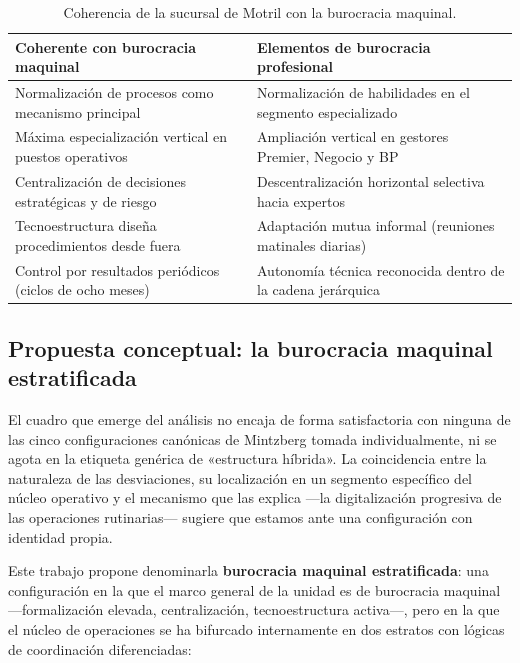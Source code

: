\begin{table}[htbp]
  \centering
  \caption{Coherencia de la sucursal de Motril con la burocracia maquinal.}
  \label{tab:coherencia}
  \small
  \begin{tabular}{p{6.2cm} p{6.2cm}}
    \toprule
    \textbf{Coherente con burocracia maquinal} & \textbf{Elementos de burocracia profesional} \\
    \midrule
    Normalización de procesos como mecanismo principal &
    Normalización de habilidades en el segmento especializado \\
    \addlinespace
    Máxima especialización vertical en puestos operativos &
    Ampliación vertical en gestores Premier, Negocio y BP \\
    \addlinespace
    Centralización de decisiones estratégicas y de riesgo &
    Descentralización horizontal selectiva hacia expertos \\
    \addlinespace
    Tecnoestructura diseña procedimientos desde fuera &
    Adaptación mutua informal (reuniones matinales diarias) \\
    \addlinespace
    Control por resultados periódicos (ciclos de ocho meses) &
    Autonomía técnica reconocida dentro de la cadena jerárquica \\
    \bottomrule
  \end{tabular}
\end{table}

\subsection{Propuesta conceptual: la burocracia maquinal estratificada}
\label{sec:bme}

El cuadro que emerge del análisis no encaja de forma satisfactoria con ninguna de
las cinco configuraciones canónicas de Mintzberg tomada individualmente, ni se
agota en la etiqueta genérica de «estructura híbrida». La coincidencia entre la
naturaleza de las desviaciones, su localización en un segmento específico del núcleo
operativo y el mecanismo que las explica ---la digitalización progresiva de las
operaciones rutinarias--- sugiere que estamos ante una configuración con identidad
propia.

Este trabajo propone denominarla \textbf{burocracia maquinal estratificada}: una
configuración en la que el marco general de la unidad es de burocracia maquinal
---formalización elevada, centralización, tecnoestructura activa---, pero en la que
el núcleo de operaciones se ha bifurcado internamente en dos estratos con lógicas
de coordinación diferenciadas:

